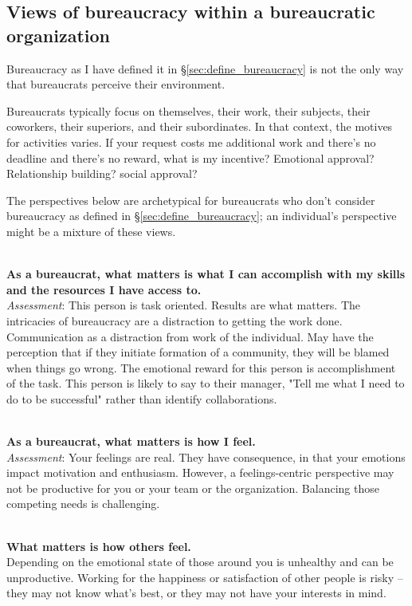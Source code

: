\subsection{Views of bureaucracy within a bureaucratic organization\label{sec:alternative_views_from_within}}

Bureaucracy as I have defined it in \S\ref{sec:define_bureaucracy} is not the only way that bureaucrats perceive their environment. 

Bureaucrats typically focus on themselves, their work, their subjects, their coworkers, their superiors, and their subordinates. In that context, the motives for activities varies.  If your request costs me additional work and there's no deadline and there's no reward, what is my incentive? Emotional approval? Relationship building? social approval?

The perspectives below are archetypical for bureaucrats who don't consider bureaucracy as defined in \S\ref{sec:define_bureaucracy}; an individual's perspective might be a mixture of these views.

\ \\

\textbf{As a bureaucrat, what matters is what I can accomplish with my skills and the resources I have access to.} \\
\textit{Assessment}: This person is task oriented. Results are what matters. The intricacies of bureaucracy are a distraction to getting the work done. 
Communication as a distraction from work of the individual. 
May have the perception that if they initiate formation of a community, they will be blamed when things go wrong.
The emotional reward for this person is accomplishment of the task. This person is likely to say to their manager, "Tell me what I need to do to be successful" rather than identify collaborations.

\ \\

\textbf{As a bureaucrat, what matters is how I feel.} \\
\textit{Assessment}: Your feelings are real. They have consequence, in that your emotions impact motivation and enthusiasm. However, a feelings-centric perspective may not be productive for you or your team or the organization. Balancing those competing needs is challenging.

\ \\ 

\textbf{What matters is how others feel.}\\
Depending on the emotional state of those around you is unhealthy and can be unproductive. Working for the happiness or satisfaction of other people is risky -- they may not know what's best, or they may not have your interests in mind.

